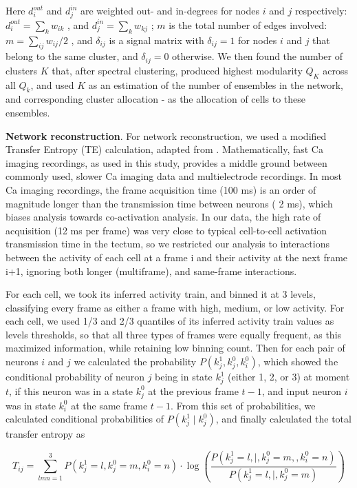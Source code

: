 \documentclass{article}
\begin{document}
Here $d^{out}_i$ and $d^{in}_j$ are weighted out- and in-degrees for nodes $i$ and $j$ respectively: $d^{out}_i = \sum_k{w_{ik}}$ , and $d^{in}_j = \sum_k{w_{kj}}$ ; $m$ is the total number of edges involved: $m = \sum_{ij}{w_{ij}}/2$ , and $\delta_{ij}$ is a signal matrix with $\delta_{ij}=1$ for nodes $i$ and $j$ that belong to the same cluster, and $\delta_{ij} = 0$ otherwise. We then found the number of clusters $K$ that, after spectral clustering, produced highest modularity $Q_K$ across all $Q_k$, and used $K$ as an estimation of the number of ensembles in the network, and corresponding cluster allocation - as the allocation of cells to these ensembles.

\textbf{Network reconstruction}. For network reconstruction, we used a modified Transfer Entropy (TE) calculation, adapted from \citep{stetter2012te,gourevitch2007te}. Mathematically, fast Ca imaging recordings, as used in this study, provides a middle ground between commonly used, slower Ca imaging data and multielectrode recordings. In most Ca imaging recordings, the frame acquisition time (100 ms) is an order of magnitude longer than the transmission time between neurons ( 2 ms), which biases analysis towards co-activation analysis. In our data, the high rate of acquisition (12 ms per frame) was very close to typical cell-to-cell activation transmission time in the tectum, so we restricted our analysis to interactions between the activity of each cell at a frame i and their activity at the next frame i+1, ignoring both longer (multiframe), and same-frame interactions.

For each cell, we took its inferred activity train, and binned it at 3 levels, classifying every frame as either a frame with high, medium, or low activity. For each cell, we used 1/3 and 2/3 quantiles of its inferred activity train values as levels thresholds, so that all three types of frames were equally frequent, as this maximized information, while retaining low binning count. Then for each pair of neurons $i$ and $j$ we calculated the probability $P(k_j^1,k_j^0,k_i^0)$, which showed the conditional probability of neuron $j$ being in state $k_j^1$ (either 1, 2, or 3) at moment $t$, if this neuron was in a state $k_j^0$ at the previous frame $t-1$, and  input neuron $i$ was in state $k_i^0$ at the same frame $t-1$. From this set of probabilities, we calculated conditional probabilities of $P(k_j^1 \mid k_j^0)$, and finally calculated the total transfer entropy as

\[ T_{ij} = \sum_{lmn=1}^3{P(k_j^1=l,k_j^0=m,k_i^0=n)}\cdot \log\left(\frac{P(k_j^1=l , \mid , k_j^0=m, , k_i^0=n)}{P(k_j^1=l , \mid , k_j^0=m)}\right) \]
\end{document}
